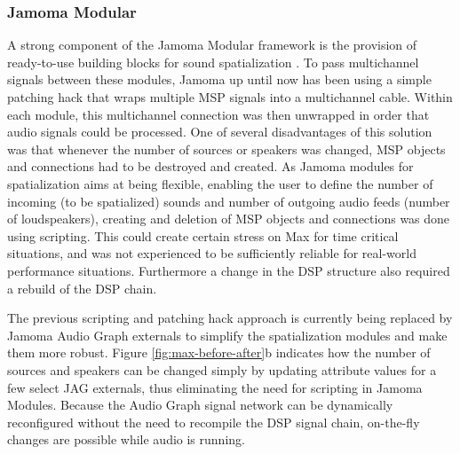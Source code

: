 \documentclass[twoside,a4paper]{article}
\begin{document}
\subsubsection{Jamoma Modular} %

A strong component of the Jamoma Modular framework is the provision of ready-to-use building blocks for sound spatialization \cite{Peters:2009}.
To pass multichannel signals between these modules, Jamoma up until now has been using a simple patching hack that wraps multiple MSP signals into a multichannel cable. Within each module, this multichannel connection was then unwrapped in order that audio signals could be processed. 
One of several disadvantages of this solution was that whenever the number of sources or speakers was changed, MSP objects and connections had to be destroyed and created.
As Jamoma modules for spatialization aims at being flexible, enabling the user to define the number of incoming (to be spatialized) sounds and number of outgoing audio feeds (number of loudspeakers), creating and deletion of MSP objects and connections was done using scripting.
This could create certain stress on Max for time critical situations, and was not experienced to be sufficiently reliable for real-world performance situations.
Furthermore a change in the DSP structure also required a rebuild of the DSP chain.

The previous scripting and patching hack approach is currently being replaced by Jamoma Audio Graph externals to simplify the spatialization modules and make them more robust.
Figure \ref{fig:max-before-after}b indicates how the number of sources and speakers can be changed simply by updating attribute values for a few select JAG externals, thus eliminating the need for scripting in Jamoma Modules.
Because the Audio Graph signal network can be dynamically reconfigured without the need to recompile the DSP signal chain, on-the-fly changes are possible while audio is running.


\end{document}
